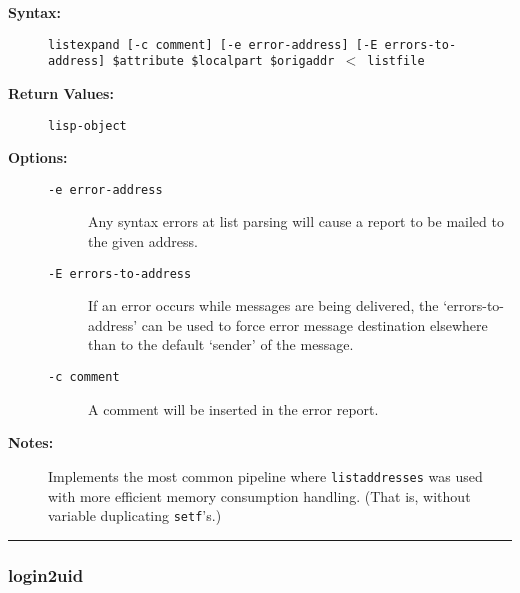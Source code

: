 \begin{description}
\item[{\bf Syntax:}] \mbox{}

{\tt listexpand [-c comment] [-e error-address] [-E errors-to-address] \$attribute \$localpart \$origaddr {\(<\)} listfile}

\item[{\bf Return Values:}] \mbox{}

{\tt lisp-object}

\item[{\bf Options:}] \mbox{}

\begin{description}
\item[{\tt -e error-address}] \mbox{}

Any syntax errors at list 
parsing will cause a report to be mailed to the given address.

\item[{\tt -E errors-to-address}] \mbox{}

If an error occurs while messages 
are being delivered, the `errors-to-address' can be used to force error 
message destination elsewhere than to the default `sender' of the message.

\item[{\tt -c comment}] \mbox{}

A comment will be inserted in the error report.

\end{description}


\item[{\bf Notes:}] \mbox{}

Implements the most common pipeline where 
{\tt listaddresses} was used with more efficient memory consumption 
handling. (That is, without variable duplicating {\tt setf}'s.)

\end{description}


\hrule
\subsubsection{login2uid}

